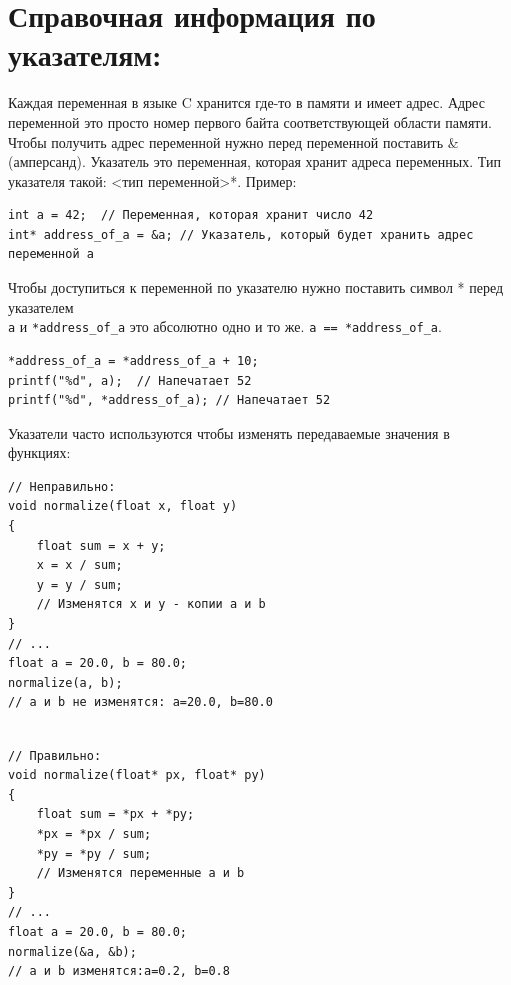 \documentclass{article}
\begin{document}
\section*{Справочная информация по указателям:}
Каждая переменная в языке C хранится где-то в памяти и имеет адрес. Адрес переменной это просто номер первого байта соответствующей области памяти. Чтобы получить адрес переменной нужно перед переменной поставить \&(амперсанд).
Указатель это переменная, которая хранит адреса переменных. Тип указателя такой: <тип переменной>*. Пример:
\begin{lstlisting}
int a = 42;  // Переменная, которая хранит число 42
int* address_of_a = &a; // Указатель, который будет хранить адрес переменной a
\end{lstlisting}
Чтобы доступиться к переменной по указателю нужно поставить символ * перед указателем\\
\texttt{a} и \texttt{*address\_of\_a} это абсолютно одно и то же. \texttt{a  ==  *address\_of\_a}.
\begin{lstlisting}
*address_of_a = *address_of_a + 10;
printf("%d", a);  // Напечатает 52
printf("%d", *address_of_a); // Напечатает 52
\end{lstlisting}
Указатели часто используются чтобы изменять передаваемые значения в функциях:
\begin{multicols}{2}
\begin{lstlisting}
// Неправильно:
void normalize(float x, float y)
{
    float sum = x + y;
    x = x / sum;
    y = y / sum; 
    // Изменятся x и y - копии a и b
}
// ...
float a = 20.0, b = 80.0;
normalize(a, b);
// a и b не изменятся: a=20.0, b=80.0
\end{lstlisting}
\begin{lstlisting}

// Правильно:
void normalize(float* px, float* py)
{
    float sum = *px + *py;
    *px = *px / sum;
    *py = *py / sum; 
    // Изменятся переменные a и b
}
// ...
float a = 20.0, b = 80.0;
normalize(&a, &b);
// a и b изменятся:a=0.2, b=0.8
\end{lstlisting}
\end{multicols}
\end{document}
